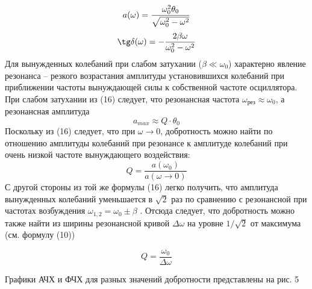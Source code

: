 \documentclass[a4paper]{article}
\begin{document}
\begin{equation}
	a(\omega)=\dfrac{\omega_0^2\theta_0}{\sqrt{\omega_0^2-\omega^2}}\\
\end{equation}
\begin{equation}
	\tg \delta(\omega)=-\dfrac{2\beta\omega}{\omega_0^2-\omega^2}
\end{equation}
Для вынужденных колебаний при слабом затухании ($\beta\ll\omega_0$)
характерно явление резонанса – резкого возрастания амплитуды
установившихся колебаний при приближении частоты вынуждающей силы к собственной частоте осциллятора. При слабом затухании из (16) следует, что резонансная частота $\omega_{\text{рез}}\approx\omega_0$, а резонансная амплитуда
\begin{equation}
	a_{max}\approx Q\cdot\theta_0
\end{equation}
Поскольку из (16) следует, что при $\omega\to0$, добротность можно найти по отношению амплитуды колебаний при резонансе к амплитуде колебаний при очень низкой частоте вынуждающего воздействия:
\begin{equation}
	Q=\dfrac{a(\omega_0)}{a(\omega\to0)}
\end{equation}
С другой стороны из той же формулы (16) легко получить, что амплитуда вынужденных колебаний уменьшается в $\sqrt 2$ раз
по сравнению с резонансной при частотах возбуждения $\omega_{1, 2}=\omega_0 \pm \beta$
. Отсюда следует, что добротность можно также найти из
ширины резонансной кривой $\Delta\omega$ на уровне $1/\sqrt 2$ от максимума (см. формулу (10))

\begin{equation}
	Q=\dfrac{\omega_0}{\Delta \omega}
\end{equation}

Графики АЧХ и ФЧХ для разных значений добротности представлены на рис. 5
\end{document}
